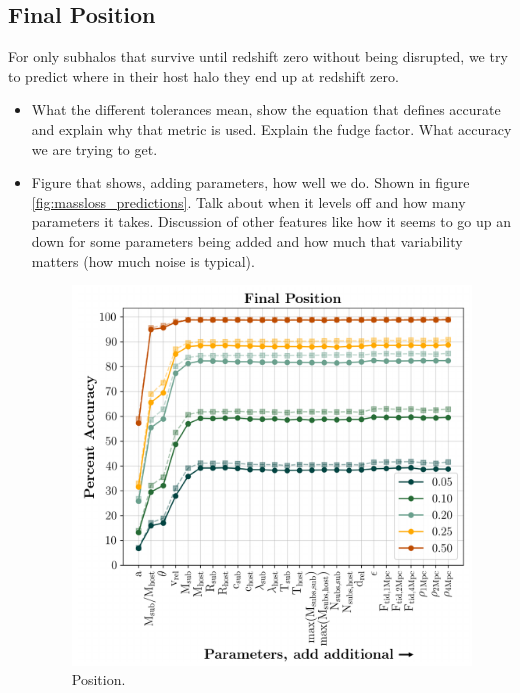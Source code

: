 \documentclass[fleqn,usenatbib]{mnras}
\begin{document}
\subsection{Final Position}
\label{sec:position}
For only subhalos that survive until redshift zero without being disrupted, we try to predict where in their host halo they end up at redshift zero.
\begin{itemize}
	\item {} What the different tolerances mean, show the equation that defines accurate and explain why that metric is used. Explain the fudge factor. What accuracy we are trying to get.
	\item Figure that shows, adding parameters, how well we do. Shown in figure \ref{fig:massloss_predictions}. Talk about when it levels off and how many parameters it takes. Discussion of other features like how it seems to go up an down for some parameters being added and how much that variability matters (how much noise is typical).
\begin{figure}
	\includegraphics[width=\columnwidth]{Figures/position_predictions}
    \caption{Position.}
    \label{fig:position_predictions}
\end{figure}

\end{itemize}
\end{document}
